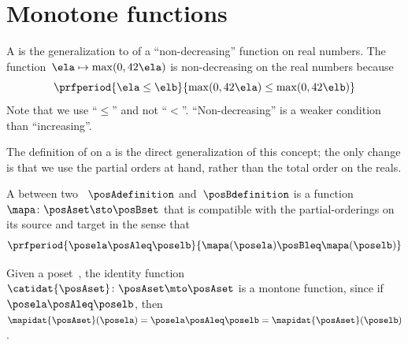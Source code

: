 
\section{Monotone functions}
\label{sec:monotonicity-monotone-maps}


A  is the generalization to  of a ``non-decreasing'' function on real numbers.
The function~$\ela \mapsto \max(0, 42 \ela)$ is non-decreasing on the real numbers because
\begin{equation}\label{eq:monotone-eq-1}
    \prfperiod{
        \ela \leq \elb
    }{
        \max(0, 42 \ela) \leq \max(0, 42 \elb)
    }
\end{equation}
Note that we use ``$\leq$'' and not ``$<$''.
``Non-decreasing'' is a weaker condition than ``increasing''.

The definition of  on a  is the direct generalization of this concept; the only change is that we use the partial orders at hand, rather than the total order on the reals.

\begin{definition}
    \label{def:monotone}
    A  between two ~$\posAdefinition$ and~$\posBdefinition$ is a function~$\mapa \colon \posAset \sto \posBset$ that is compatible with the partial-orderings on its source and target in the sense that
    \begin{equation}\label{eq:monotone-map-definition}
        \prfperiod{
            \posela \posAleq \poselb
        }{
            \mapa(\posela) \posBleq \mapa(\poselb)
        }
    \end{equation}
\end{definition}

\begin{example}
    Given a poset~\posA, the identity function~$\catidat{\posAset}\colon \posAset \mto\linebreak[0] \posAset$ is a montone function, since if~$\posela\posAleq \poselb$, then~$\mapidat{\posAset}(\posela)=\posela \posAleq \poselb = \mapidat{\posAset}(\poselb )$.
\end{example}

